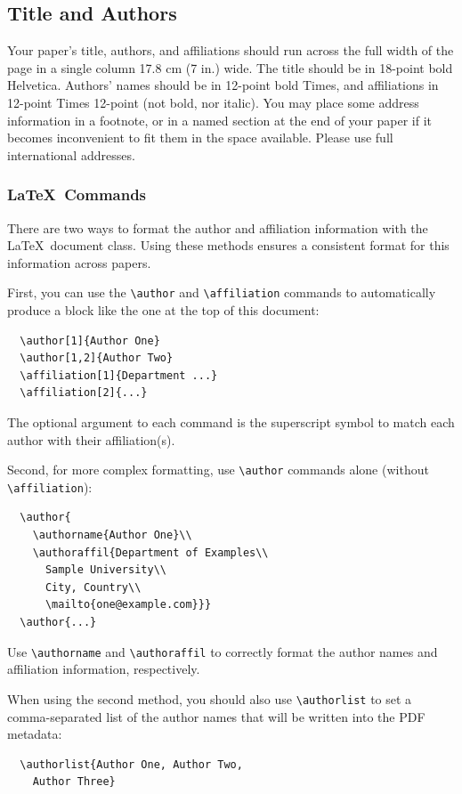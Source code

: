 \documentclass[preprint]{../latex/sigchi-modern}
\begin{document}
\subsection{Title and Authors}
Your paper's title, authors, and affiliations should run across the full width of
the page in a single column 17.8 cm (7 in.) wide. The title should be in
18-point bold Helvetica. Authors' names should be in 12-point bold Times, and
affiliations in 12-point Times 12-point (not bold, nor italic).
You may place some address information in a footnote, or in a named section at
the end of your paper if it becomes inconvenient to fit them in the space
available. Please use full international addresses.

\subsubsection{\LaTeX\ Commands}
There are two ways to format the author and affiliation information  with the
\LaTeX\ document class. Using these methods ensures a consistent format for
this information across papers.

First, you can use the \texttt{\textbackslash author} and 
\texttt{\textbackslash affiliation} commands to automatically produce a block
like the one at the top of this document:
\begin{verbatim}
  \author[1]{Author One}
  \author[1,2]{Author Two}
  \affiliation[1]{Department ...}
  \affiliation[2]{...}
\end{verbatim}
The optional argument to each command is the superscript symbol to match each
author with their affiliation(s).

Second, for more complex formatting, use
\texttt{\textbackslash author} commands alone (without
\texttt{\textbackslash affiliation}):
\begin{verbatim}
  \author{
    \authorname{Author One}\\
    \authoraffil{Department of Examples\\
      Sample University\\
      City, Country\\
      \mailto{one@example.com}}}
  \author{...}
\end{verbatim}
Use \texttt{\textbackslash authorname} and \texttt{\textbackslash authoraffil}
to correctly format the author names and affiliation information, respectively.

When using the second method, you should also use
\texttt{\textbackslash author\-list} to set a comma-separated list of
the author names that will be written into the PDF metadata:
\begin{verbatim}
  \authorlist{Author One, Author Two, 
    Author Three}
\end{verbatim}
\end{document}
